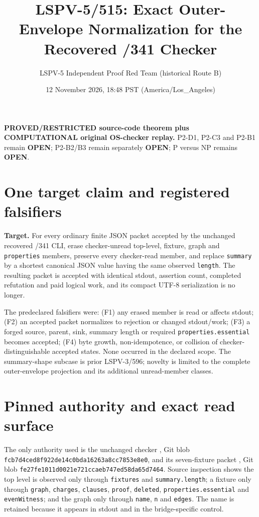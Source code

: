 \documentclass[11pt]{article}
\title{LSPV-5/515: Exact Outer-Envelope Normalization for the Recovered /341 Checker}
\author{LSPV-5 Independent Proof Red Team (historical Route B)}
\date{12 November 2026, 18:48 PST (America/Los\_Angeles)}
\newcommand{\status}[1]{\textbf{#1}}
\begin{document}
\maketitle

\noindent\status{PROVED/RESTRICTED source-code theorem plus COMPUTATIONAL original OS-checker replay.}
P2-D1, P2-C3 and P2-B1 remain \status{OPEN}; P2-B2/B3 remain separately \status{OPEN}; P versus NP remains \status{OPEN}.

\section*{One target claim and registered falsifiers}
\textbf{Target.}  For every ordinary finite JSON packet accepted by the unchanged recovered /341 CLI, erase checker-unread top-level, fixture, graph and \texttt{properties} members, preserve every checker-read member, and replace \texttt{summary} by a shortest canonical JSON value having the same observed \texttt{length}.  The resulting packet is accepted with identical stdout, assertion count, completed refutation and paid logical work, and its compact UTF-8 serialization is no longer.

The predeclared falsifiers were: (F1) any erased member is read or affects stdout; (F2) an accepted packet normalizes to rejection or changed stdout/work; (F3) a forged source, parent, sink, summary length or required \texttt{properties.essential} becomes accepted; (F4) byte growth, non-idempotence, or collision of checker-distinguishable accepted states.  None occurred in the declared scope.  The summary-shape subcase is prior LSPV-3/596; novelty is limited to the complete outer-envelope projection and its additional unread-member classes.

\section*{Pinned authority and exact read surface}
The only authority used is the unchanged checker
, Git blob
\texttt{fcb7d4ced8f922de14c0bda16263a8cc7853e8e0}, and its seven-fixture packet
, Git blob
\texttt{fe27fe1011d0021e721ccaeb747ed58da65d7464}.  Source inspection shows the top level is observed only through \texttt{fixtures} and \texttt{summary.length}; a fixture only through \texttt{graph}, \texttt{charges}, \texttt{clauses}, \texttt{proof}, \texttt{deleted}, \texttt{properties.essential} and \texttt{evenWitness}; and the graph only through \texttt{name}, \texttt{n} and \texttt{edges}.  The name is retained because it appears in stdout and in the bridge-specific control.
\end{document}
